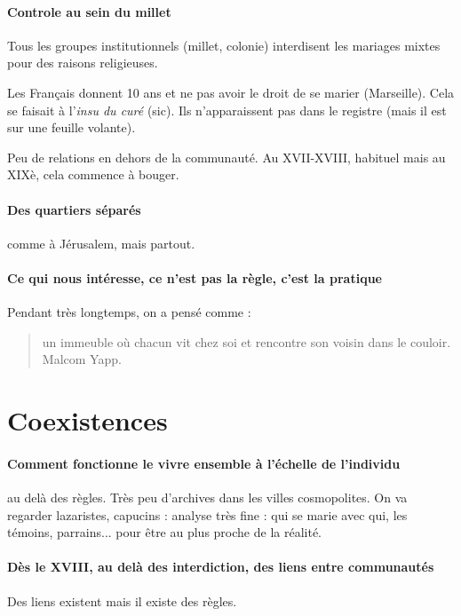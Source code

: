 \paragraph{Controle au sein du millet} Tous les groupes institutionnels (millet, colonie) interdisent les mariages mixtes pour des raisons religieuses. 
\begin{Ex}
Les Français donnent 10 ans et ne pas avoir le droit de se marier (Marseille).
Cela se faisait à l'\textit{insu du curé} (sic). Ils n'apparaissent pas dans le registre (mais il est sur une feuille volante). 

\end{Ex}
Peu de relations en dehors de la communauté. Au XVII-XVIII, habituel mais au XIXè, cela commence à bouger. 
\paragraph{Des quartiers séparés} comme à Jérusalem, mais partout.

\paragraph{Ce qui nous intéresse, ce n'est pas la règle, c'est la pratique} Pendant très longtemps, on a pensé comme :
\begin{quote}
    {un immeuble où chacun vit chez soi et rencontre son voisin dans le couloir. Malcom Yapp.}
\end{quote}


\section{Coexistences}

\paragraph{Comment fonctionne le vivre ensemble à l'échelle de l'individu} au delà des règles. 
Très peu d'archives dans les villes cosmopolites. On va regarder lazaristes, capucins : analyse très fine : qui se marie avec qui, les témoins, parrains... pour être au plus proche de la réalité.

\paragraph{Dès le XVIII, au delà des interdiction, des liens entre communautés} Des liens existent mais il existe des règles. 


